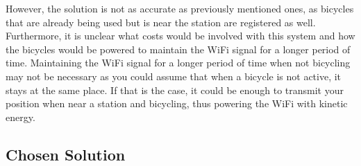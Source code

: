However, the solution is not as accurate as previously mentioned ones, as bicycles that are already being used but is near the station are registered as well.
Furthermore, it is unclear what costs would be involved with this system and how the bicycles would be powered to maintain the WiFi signal for a longer period of time. 
Maintaining the WiFi signal for a longer period of time when not bicycling may not be necessary as you could assume that when a bicycle is not active, it stays at the same place.
If that is the case, it could be enough to transmit your position when near a station and bicycling, thus powering the WiFi with kinetic energy.

\subsection{Chosen Solution}

